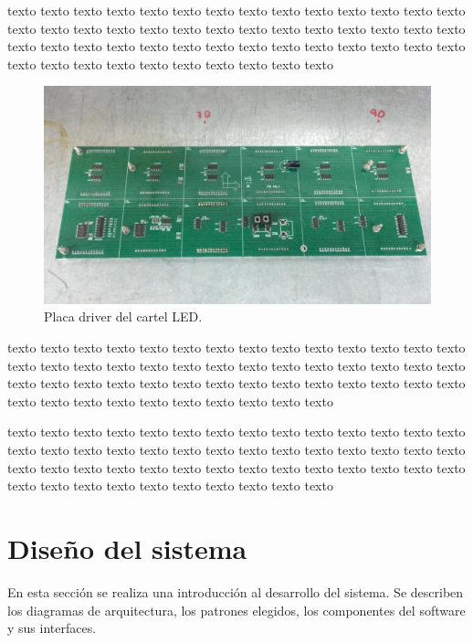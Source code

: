 \documentclass[
11pt, %
]{charter}
\begin{document}
texto texto texto texto texto texto texto texto texto texto texto texto texto texto texto texto texto texto texto texto texto texto texto texto texto texto texto texto texto texto texto texto texto texto texto texto texto texto texto texto texto texto texto texto texto texto texto texto texto texto texto texto 



\begin{figure}[htpb]
\centering 
\includegraphics[width=1\textwidth]{./Pics/LED_matrix_driver.jpeg}
\caption{Placa driver del cartel LED.}
\label{fig:driver de cartel LED.}
\end{figure}


texto texto texto texto texto texto texto texto texto texto texto texto texto texto texto texto texto texto texto texto texto texto texto texto texto texto texto texto texto texto texto texto texto texto texto texto texto texto texto texto texto texto texto texto texto texto texto texto texto texto texto texto 


texto texto texto texto texto texto texto texto texto texto texto texto texto texto texto texto texto texto texto texto texto texto texto texto texto texto texto texto texto texto texto texto texto texto texto texto texto texto texto texto texto texto texto texto texto texto texto texto texto texto texto texto 




\pagebreak

\section{Diseño del sistema}
En esta sección se realiza una introducción al desarrollo del sistema. Se describen los diagramas de arquitectura, los patrones elegidos, los componentes del software y sus interfaces.
\end{document}
